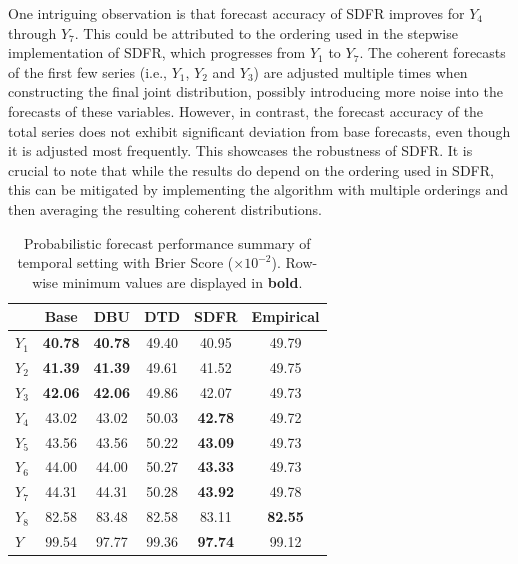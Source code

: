 \documentclass[a4paper,review,12pt,authoryear]{elsarticle}
\theoremstyle{definition}
\begin{document}
     One intriguing observation is that forecast accuracy of SDFR improves for $Y_4$ through $Y_7$.
     This could be attributed to the ordering used in the stepwise implementation of SDFR, which progresses from $Y_1$ to $Y_7$. The coherent forecasts of the first few series (i.e., $Y_1$, $Y_2$ and $Y_3$) are adjusted multiple times when constructing the final joint distribution, possibly introducing more noise into the forecasts of these variables. However, in contrast, the forecast accuracy of the total series does not exhibit significant deviation from base forecasts,  even though it is adjusted most frequently. This showcases the robustness of SDFR. It is crucial to note that while the results do depend on the ordering used in SDFR, this can be mitigated by implementing the algorithm with multiple orderings and then averaging the resulting coherent distributions.

     \begin{table}
     \centering
     \caption{\label{tab:sim_temporal_res_dist} Probabilistic forecast performance summary of temporal setting with Brier Score ($\times 10^{-2}$). Row-wise minimum values are displayed in \textbf{bold}.}
     \begin{tabular}{lccccc}
     \toprule
      & Base & DBU & DTD & SDFR & Empirical \\\midrule
      $Y_1$ & \textbf{40.78} & \textbf{40.78} & 49.40 & 40.95 & 49.79 \\ 
      $Y_2$ & \textbf{41.39} & \textbf{41.39} & 49.61 & 41.52 & 49.75 \\ 
      $Y_3$ & \textbf{42.06} & \textbf{42.06} & 49.86 & 42.07 & 49.73 \\ 
      $Y_4$ & 43.02 & 43.02 & 50.03 & \textbf{42.78} & 49.72 \\ 
      $Y_5$ & 43.56 & 43.56 & 50.22 & \textbf{43.09} & 49.73 \\ 
      $Y_6$ & 44.00 & 44.00 & 50.27 & \textbf{43.33} & 49.73 \\ 
      $Y_7$ & 44.31 & 44.31 & 50.28 & \textbf{43.92} & 49.78 \\ 
      $Y_8$ & 82.58 & 83.48 & 82.58 & 83.11 & \textbf{82.55} \\ 
      $Y$ & 99.54 & 97.77 & 99.36 & \textbf{97.74} & 99.12 \\ 
     \bottomrule
     \end{tabular}
     \end{table}
\end{document}
